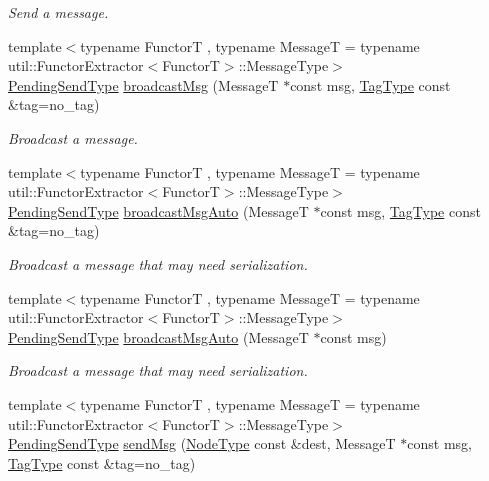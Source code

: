 \begin{DoxyCompactItemize}
\begin{DoxyCompactList}\small\item\em Send a message. \end{DoxyCompactList}\item 
{\footnotesize template$<$typename FunctorT , typename MessageT  = typename util\+::\+Functor\+Extractor$<$\+Functor\+T$>$\+::\+Message\+Type$>$ }\\\hyperlink{structvt_1_1messaging_1_1_active_messenger_a3626a6ca76d8ad4ec7c3b47a2c70d3a8}{Pending\+Send\+Type} \hyperlink{group__functorsend_gaa5b764aaa06e9c9141b04f6d8a420d43}{broadcast\+Msg} (MessageT $\ast$const msg, \hyperlink{namespacevt_a84ab281dae04a52a4b243d6bf62d0e52}{Tag\+Type} const \&tag=no\+\_\+tag)
\begin{DoxyCompactList}\small\item\em Broadcast a message. \end{DoxyCompactList}\item 
{\footnotesize template$<$typename FunctorT , typename MessageT  = typename util\+::\+Functor\+Extractor$<$\+Functor\+T$>$\+::\+Message\+Type$>$ }\\\hyperlink{structvt_1_1messaging_1_1_active_messenger_a3626a6ca76d8ad4ec7c3b47a2c70d3a8}{Pending\+Send\+Type} \hyperlink{group__functorsend_gad896e15fd2c34447ae4cc5b0f6dd211f}{broadcast\+Msg\+Auto} (MessageT $\ast$const msg, \hyperlink{namespacevt_a84ab281dae04a52a4b243d6bf62d0e52}{Tag\+Type} const \&tag=no\+\_\+tag)
\begin{DoxyCompactList}\small\item\em Broadcast a message that may need serialization. \end{DoxyCompactList}\item 
{\footnotesize template$<$typename FunctorT , typename MessageT  = typename util\+::\+Functor\+Extractor$<$\+Functor\+T$>$\+::\+Message\+Type$>$ }\\\hyperlink{structvt_1_1messaging_1_1_active_messenger_a3626a6ca76d8ad4ec7c3b47a2c70d3a8}{Pending\+Send\+Type} \hyperlink{group__functorsend_gad73652d3cef1ea2ea1df3a2ca38ee7ba}{broadcast\+Msg\+Auto} (MessageT $\ast$const msg)
\begin{DoxyCompactList}\small\item\em Broadcast a message that may need serialization. \end{DoxyCompactList}\item 
{\footnotesize template$<$typename FunctorT , typename MessageT  = typename util\+::\+Functor\+Extractor$<$\+Functor\+T$>$\+::\+Message\+Type$>$ }\\\hyperlink{structvt_1_1messaging_1_1_active_messenger_a3626a6ca76d8ad4ec7c3b47a2c70d3a8}{Pending\+Send\+Type} \hyperlink{group__functorsend_ga13e2d0b763ed5baac91fb86472d39f5e}{send\+Msg} (\hyperlink{namespacevt_a866da9d0efc19c0a1ce79e9e492f47e2}{Node\+Type} const \&dest, MessageT $\ast$const msg, \hyperlink{namespacevt_a84ab281dae04a52a4b243d6bf62d0e52}{Tag\+Type} const \&tag=no\+\_\+tag)

\end{DoxyCompactItemize}
